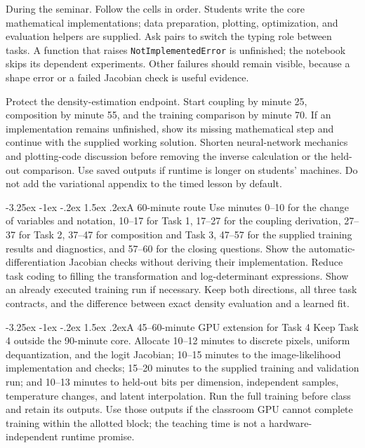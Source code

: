 \documentclass[11pt,a4paper]{article}
\makeatletter
\renewcommand\subsection{\@startsection{subsection}{2}{\z@}%
  {-3.25ex \@plus -1ex \@minus -.2ex}%
  {1.5ex \@plus .2ex}{\normalfont\large}}
\makeatother
\begin{document}
During the seminar. Follow the cells in order. Students write the
core mathematical implementations; data preparation, plotting, optimization,
and evaluation helpers are supplied. Ask pairs to switch the typing role
between tasks. A function that raises \texttt{NotImplementedError} is unfinished;
the notebook skips its dependent experiments. Other failures should remain
visible, because a shape error or a failed Jacobian check is useful evidence.

Protect the density-estimation endpoint. Start coupling by minute 25,
composition by minute 55, and the training comparison by minute 70. If an
implementation remains unfinished, show its missing mathematical step and
continue with the supplied working solution. Shorten neural-network mechanics
and plotting-code discussion before removing the inverse calculation or the
held-out comparison. Use saved outputs if runtime is longer on students'
machines. Do not add the variational appendix to the timed lesson by default.

\subsection{A 60-minute route}
Use minutes 0--10 for the change of variables and notation, 10--17 for Task 1,
17--27 for the coupling derivation, 27--37 for Task 2, 37--47 for composition
and Task 3, 47--57 for the supplied training results and diagnostics, and
57--60 for the closing questions. Show the automatic-differentiation Jacobian checks
without deriving their implementation. Reduce task coding to filling the
transformation and log-determinant expressions. Show an already executed
training run if necessary. Keep both directions, all three task contracts,
and the difference between exact density evaluation and a learned fit.

\subsection{A 45--60-minute GPU extension for Task 4}
Keep Task 4 outside the 90-minute core. Allocate 10--12 minutes to discrete
pixels, uniform dequantization, and the logit Jacobian; 10--15 minutes to the
image-likelihood implementation and checks; 15--20 minutes to the supplied
training and validation run; and 10--13 minutes to held-out bits per dimension,
independent samples, temperature changes, and latent interpolation. Run the
full training before class and retain its outputs. Use those outputs if the
classroom GPU cannot complete training within the allotted block; the teaching
time is not a hardware-independent runtime promise.
\end{document}
